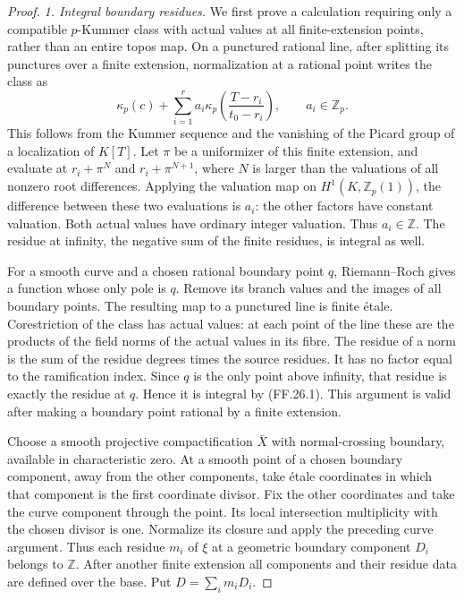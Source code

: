 \begin{proof}
\emph{1. Integral boundary residues.}
We first prove a calculation requiring only a compatible
\(p\)-Kummer class with actual values at all finite-extension
points, rather than an entire topos map. On a punctured
rational line, after splitting its punctures over a finite
extension, normalization at a rational point writes the
class as
\[
 \kappa_p(c)+\sum_{i=1}^r a_i
       \kappa_p\left(\frac{T-r_i}{t_0-r_i}\right),
                  \qquad a_i\in\mathbb Z_p.             \tag{FF.26.1}
\]
This follows from the Kummer sequence and the vanishing of
the Picard group of a localization of \(K[T]\).
Let \(\pi\) be a uniformizer of this finite extension,
and evaluate at \(r_i+\pi^N\) and \(r_i+\pi^{N+1}\),
where \(N\) is larger than the valuations of all nonzero
root differences. Applying the valuation map on
\(H^1(K,\mathbb Z_p(1))\), the difference between these
two evaluations is \(a_i\): the other factors have
constant valuation. Both actual values have ordinary
integer valuation. Thus \(a_i\in\mathbb Z\). The residue
at infinity, the negative sum of the finite residues,
is integral as well.

For a smooth curve and a chosen rational boundary point
\(q\), Riemann--Roch gives a function whose only pole
is \(q\). Remove its branch values and the images of
all boundary points. The resulting map to a punctured
line is finite \'etale. Corestriction of the class has
actual values: at each point of the line these are the
products of the field norms of the actual values in its
fibre. The residue of a norm is the sum of the residue
degrees times the source residues. It has no factor
equal to the ramification index. Since \(q\) is the
only point above infinity, that residue is exactly
the residue at \(q\). Hence it is integral by (FF.26.1).
This argument is valid after making a boundary point
rational by a finite extension.

Choose a smooth projective compactification \(\bar X\)
with normal-crossing boundary, available in characteristic
zero. At a smooth point of a chosen boundary component,
away from the other components, take \'etale coordinates
in which that component is the first coordinate divisor.
Fix the other coordinates and take the curve component
through the point. Its local intersection multiplicity
with the chosen divisor is one. Normalize its closure
and apply the preceding curve argument. Thus each residue
\(m_i\) of \(\xi\) at a geometric boundary component
\(D_i\) belongs to \(\mathbb Z\). After another finite
extension all components and their residue data are defined
over the base. Put \(D=\sum_i m_iD_i\).


\end{proof}
